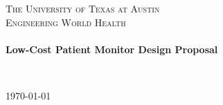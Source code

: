 \begin{titlepage}
\begin{center}

\textsc{\LARGE The University of Texas at Austin}\\[1.5cm]

\textsc{\Large Engineering World Health }\\[0.5cm]

\HRule \\[0.4cm]
{ \huge \bfseries Low-Cost Patient Monitor Design Proposal \\[0.4cm] }

\HRule \\[1.5cm]


\vfill

{\large \today}

\end{center}
\end{titlepage}

